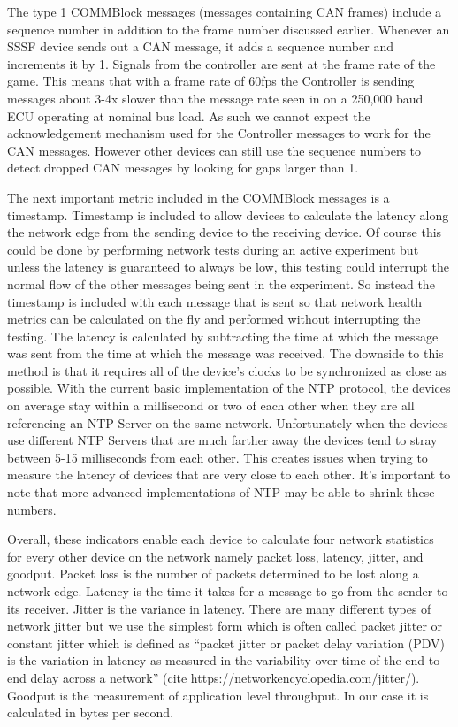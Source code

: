 \documentclass[letterpaper,twocolumn,12pt]{article}
\begin{document}
The type 1 COMMBlock messages (messages containing CAN frames) include a sequence number in addition to the frame number discussed earlier. Whenever an SSSF device sends out a CAN message, it adds a sequence number and increments it by 1. Signals from the controller are sent at the frame rate of the game. This means that with a frame rate of 60fps the Controller is sending messages about 3-4x slower than the message rate seen in on a 250,000 baud ECU operating at nominal bus load. As such we cannot expect the acknowledgement mechanism used for the Controller messages to work for the CAN messages. However other devices can still use the sequence numbers to detect dropped CAN messages by looking for gaps larger than 1.

The next important metric included in the COMMBlock messages is a timestamp. Timestamp is included to allow devices to calculate the latency along the network edge from the sending device to the receiving device. Of course this could be done by performing network tests during an active experiment but unless the latency is guaranteed to always be low, this testing could interrupt the normal flow of the other messages being sent in the experiment. So instead the timestamp is included with each message that is sent so that network health metrics can be calculated on the fly and performed without interrupting the testing. The latency is calculated by subtracting the time at which the message was sent from the time at which the message was received. The downside to this method is that it requires all of the device's clocks to be synchronized as close as possible. With the current basic implementation of the NTP protocol, the devices on average stay within a millisecond or two of each other when they are all referencing an NTP Server on the same network. Unfortunately when the devices use different NTP Servers that are much farther away the devices tend to stray between 5-15 milliseconds from each other. This creates issues when trying to measure the latency of devices that are very close to each other. It's important to note that more advanced implementations of NTP may be able to shrink these numbers.

Overall, these indicators enable each device to calculate four network statistics for every other device on the network namely packet loss, latency, jitter, and goodput. Packet loss is the number of packets determined to be lost along a network edge. Latency is the time it takes for a message to go from the sender to its receiver. Jitter is the variance in latency. There are many different types of network jitter but we use the simplest form which is often called packet jitter or constant jitter which is defined as “packet jitter or packet delay variation (PDV) is the variation in latency as measured in the variability over time of the end-to-end delay across a network” (cite https://networkencyclopedia.com/jitter/). Goodput is the measurement of application level throughput. In our case it is calculated in bytes per second.
\end{document}
